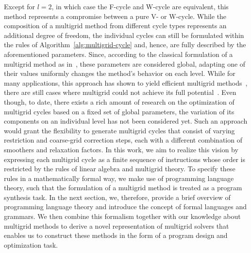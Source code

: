 Except for $l = 2$, in which case the F-cycle and W-cycle are equivalent, this method represents a compromise between a pure V- or W-cycle.
While the composition of a multigrid method from different cycle types represents an additional degree of freedom, the individual cycles can still be formulated within the rules of Algorithm~\ref{alg:multigrid-cycle} and, hence, are fully described by the aforementioned parameters.
Since, according to the classical formulation of a multigrid method as in~\cite{brandt1977multi,hackbusch2013multi,trottenberg2000multigrid,briggs2000multigrid}, these parameters are considered global, adapting one of their values uniformly changes the method's behavior on each level. 
While for many applications, this approach has shown to yield efficient multigrid methods~\cite{trottenberg2000multigrid}, there are still cases where multigrid could not achieve its full potential~\cite{ernst2012difficult,benzi2005numerical}.
Even though, to date, there exists a rich amount of research on the optimization of multigrid cycles based on a fixed set of global parameters, the variation of its components on an individual level has not been considered yet.
Such an approach would grant the flexibility to generate multigrid cycles that consist of varying restriction and coarse-grid correction steps, each with a different combination of smoothers and relaxation factors.
In this work, we aim to realize this vision by expressing each multigrid cycle as a finite sequence of instructions whose order is restricted by the rules of linear algebra and multigrid theory.
To specify these rules in a mathematically formal way, we make use of programming language theory, such that the formulation of a multigrid method is treated as a program synthesis task.
In the next section, we, therefore, provide a brief overview of programming language theory and introduce the concept of formal languages and grammars.
We then combine this formalism together with our knowledge about multigrid methods to derive a novel representation of multigrid solvers that enables us to construct these methods in the form of a program design and optimization task.
